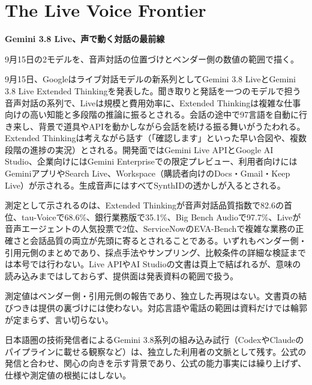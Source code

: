 \section{The Live Voice Frontier}
\begin{wideflow}
{\Large\bfseries Gemini 3.8 Live、声で動く対話の最前線}\par
\smallskip
{\color{SurveyMuted}9月15日の2モデルを、音声対話の位置づけとベンダー側の数値の範囲で描く。}\par
\end{wideflow}

9月15日、Googleはライブ対話モデルの新系列としてGemini 3.8 LiveとGemini 3.8 Live Extended Thinkingを発表した\cite{geminilive}。聞き取りと発話を一つのモデルで担う音声対話の系列で、Liveは規模と費用効率に、Extended Thinkingは複雑な仕事向けの高い知能と多段階の推論に振るとされる。会話の途中で97言語を自動に行き来し、背景で道具やAPIを動かしながら会話を続ける振る舞いがうたわれる。Extended Thinkingは考えながら話す（「確認します」といった早い合図や、複数段階の進捗の実況）とされる。開発面ではGemini Live APIとGoogle AI Studio、企業向けにはGemini Enterpriseでの限定プレビュー、利用者向けにはGeminiアプリやSearch Live、Workspace（購読者向けのDocs・Gmail・Keep Live）が示される。生成音声にはすべてSynthIDの透かしが入るとされる。

測定として示されるのは、Extended Thinkingが音声対話品質指数で82.6の首位、tau-Voiceで68.6\%、銀行業務版で35.1\%、Big Bench Audioで97.7\%、Liveが音声エージェントの人気投票で2位、ServiceNowのEVA-Benchで複雑な業務の正確さと会話品質の両立が先頭に寄るとされることである\cite{geminilive}。いずれもベンダー側・引用元側のまとめであり、採点手法やサンプリング、比較条件の詳細な検証までは本号では行わない。Live APIやAI Studioの文書は頁上で結ばれるが、意味の読み込みまではしておらず、提供面は発表資料の範囲で扱う。

\begin{claimboundary}[測定と提供の境界]
測定値はベンダー側・引用元側の報告であり、独立した再現はない。文書頁の結びつきは提供の裏づけには使わない。対応言語や電話の範囲は資料だけでは輪郭が定まらず、言い切らない。
\end{claimboundary}

\begin{communitynote}
日本語圏の技術発信者によるGemini 3.8系列の組み込み試行（CodexやClaudeのパイプラインに載せる観察など）は、独立した利用者の文脈として残す\cite{w38x-gemini-jp}。公式の発信\cite{w38x-gemini-off}と合わせ、関心の向きを示す背景であり、公式の能力事実には繰り上げず、仕様や測定値の根拠にはしない。
\end{communitynote}
